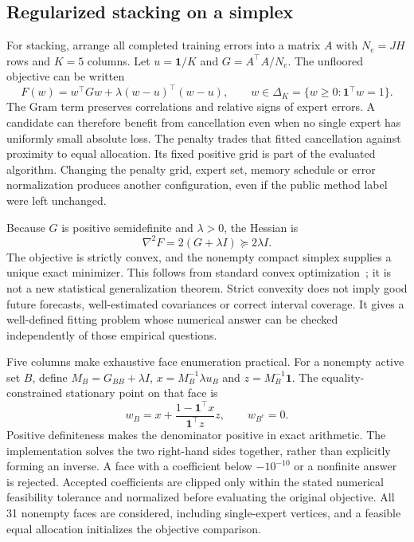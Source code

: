 \subsection{Regularized stacking on a simplex}
For stacking, arrange all completed training errors into a matrix $A$ with $N_e=JH$ rows and $K=5$ columns. Let $u=\mathbf1/K$ and $G=A^\top A/N_e$. The unfloored objective can be written
\begin{equation}\label{eq:quadratic-stacking}
F(w)=w^\top G w+\lambda(w-u)^\top(w-u),\qquad
w\in\Delta_K=\{w\ge0:\mathbf1^\top w=1\}.
\end{equation}
The Gram term preserves correlations and relative signs of expert errors. A candidate can therefore benefit from cancellation even when no single expert has uniformly small absolute loss. The penalty trades that fitted cancellation against proximity to equal allocation. Its fixed positive grid is part of the evaluated algorithm. Changing the penalty grid, expert set, memory schedule or error normalization produces another configuration, even if the public method label were left unchanged.

Because $G$ is positive semidefinite and $\lambda>0$, the Hessian is
\begin{equation}\label{eq:positive-hessian}
\nabla^2F=2(G+\lambda I)\succeq2\lambda I.
\end{equation}
The objective is strictly convex, and the nonempty compact simplex supplies a unique exact minimizer. This follows from standard convex optimization~\cite{boyd}; it is not a new statistical generalization theorem. Strict convexity does not imply good future forecasts, well-estimated covariances or correct interval coverage. It gives a well-defined fitting problem whose numerical answer can be checked independently of those empirical questions.

Five columns make exhaustive face enumeration practical. For a nonempty active set $B$, define $M_B=G_{BB}+\lambda I$, $x=M_B^{-1}\lambda u_B$ and $z=M_B^{-1}\mathbf1$. The equality-constrained stationary point on that face is
\begin{equation}\label{eq:face-solution}
w_B=x+\frac{1-\mathbf1^\top x}{\mathbf1^\top z}z,\qquad w_{B^c}=0.
\end{equation}
Positive definiteness makes the denominator positive in exact arithmetic. The implementation solves the two right-hand sides together, rather than explicitly forming an inverse. A face with a coefficient below $-10^{-10}$ or a nonfinite answer is rejected. Accepted coefficients are clipped only within the stated numerical feasibility tolerance and normalized before evaluating the original objective. All 31 nonempty faces are considered, including single-expert vertices, and a feasible equal allocation initializes the objective comparison.


